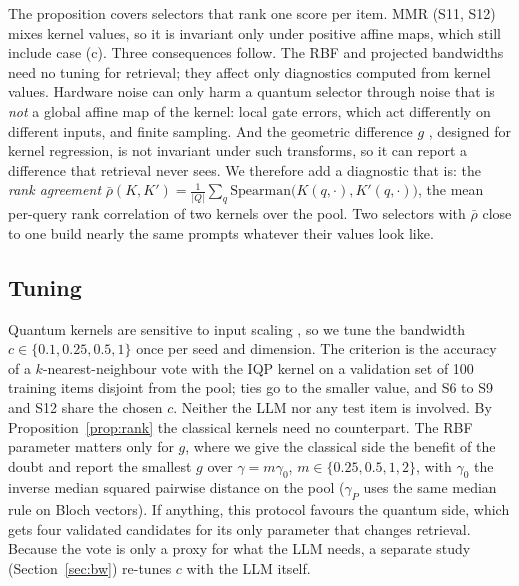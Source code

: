 The proposition covers selectors that rank one score per item. MMR (S11, S12) mixes kernel values, so
it is invariant only under positive affine maps, which still include case (c). Three consequences follow. The RBF and projected bandwidths need no tuning for retrieval; they affect
only diagnostics computed from kernel values. Hardware noise can only harm a quantum selector through
noise that is \emph{not} a global affine map of the kernel: local gate errors, which act differently on
different inputs, and finite sampling. And the geometric difference $g$ \cite{huang2021power}, designed
for kernel regression, is not invariant under such transforms, so it can report a difference that
retrieval never sees. We therefore add a diagnostic that is: the \emph{rank agreement}
$\bar\rho(K,K')=\frac{1}{|Q|}\sum_q\mathrm{Spearman}\bigl(K(q,\cdot),K'(q,\cdot)\bigr)$, the mean per-query
rank correlation of two kernels over the pool. Two selectors with $\bar\rho$ close to one build nearly the
same prompts whatever their values look like.

\subsection{Tuning}
\label{sec:tune}
Quantum kernels are sensitive to input scaling \cite{shaydulin2022importance,canatar2023bandwidth}, so
we tune the bandwidth $c\in\{0.1,0.25,0.5,1\}$ once per seed and dimension. The criterion is the
accuracy of a $k$-nearest-neighbour vote with the IQP kernel on a validation set of 100 training items
disjoint from the pool; ties go to the smaller value, and S6 to S9 and S12 share the chosen $c$. Neither the
LLM nor any test item is involved. By Proposition~\ref{prop:rank} the classical kernels need no
counterpart. The RBF parameter matters only for $g$, where we give the classical side the benefit of
the doubt and report the smallest $g$ over $\gamma=m\gamma_0$, $m\in\{0.25,0.5,1,2\}$, with $\gamma_0$ the
inverse median squared pairwise distance on the pool ($\gamma_P$ uses the same median rule on Bloch
vectors). If anything, this protocol favours the quantum side, which gets four validated candidates for
its only parameter that changes retrieval. Because the vote is only a proxy for what the LLM needs, a
separate study (Section~\ref{sec:bw}) re-tunes $c$ with the LLM itself.

